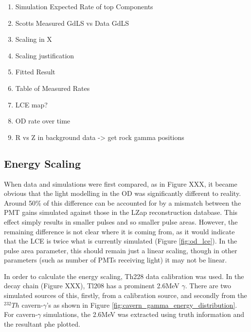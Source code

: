 \begin{tcolorbox}[colback=red!5!white, colframe=red!50!black, title=Key Plots]
\begin{enumerate}
    \item Simulation Expected Rate of top Components
    \item Scotts Measured GdLS vs Data GdLS
    \item Scaling in X
    \item Scaling justification
    \item Fitted Result
    \item Table of Measured Rates
    \item LCE map?
    \item OD rate over time
    \item R vs Z in background data -> get rock gamma positions    
\end{enumerate}
\end{tcolorbox}


\subsection{Energy Scaling}
\par
When data and simulations were first compared, as in Figure XXX, it became obvious that the light modelling in the OD was significantly different to reality.
Around 50\% of this difference can be accounted for by a mismatch between the PMT gains simulated against those in the LZap reconstruction database.
This effect simply results in smaller pulses and so smaller pulse areas.
However, the remaining difference is not clear where it is coming from, as it would indicate that the LCE is twice what is currently simulated (Figure \ref{fig:od_lce}).
In the pulse area parameter, this should remain just a linear scaling, though in other parameters (such as number of PMTs receiving light) it may not be linear.

\par
In order to calculate the energy scaling, Th228 data calibration was used. 
In the decay chain (Figure XXX), Tl208 has a prominent 2.6MeV $\gamma$. 
There are two simulated sources of this, firstly, from a calibration source, and secondly from the ${}^{232}Th$ cavern-$\gamma$'s as shown in Figure \ref{fig:cavern_gamma_energy_distribution}.
For cavern-$\gamma$ simulations, the 2.6MeV was extracted using truth information and the resultant phe plotted.


